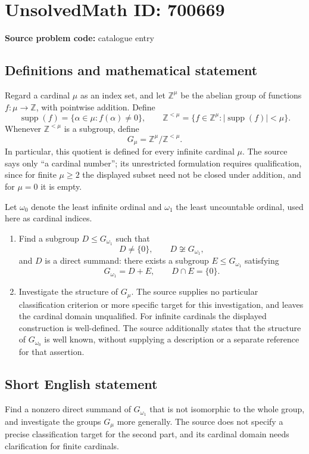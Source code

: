 \documentclass[11pt]{article}
\newcommand{\Z}{\mathbb{Z}}
\begin{document}
\section*{UnsolvedMath ID: 700669}
\textbf{Source problem code:} catalogue entry
\subsection{Definitions and mathematical statement}
Regard a cardinal \(\mu\) as an index set, and let \(\Z^\mu\) be the abelian group of functions \(f\colon\mu\to\Z\), with pointwise addition. Define
\[
\operatorname{supp}(f)=\{\alpha\in\mu:f(\alpha)\ne0\},\qquad
\Z^{<\mu}=\{f\in\Z^\mu:|\operatorname{supp}(f)|<\mu\}.
\]
Whenever \(\Z^{<\mu}\) is a subgroup, define
\[
G_\mu=\Z^\mu/\Z^{<\mu}.
\]
In particular, this quotient is defined for every infinite cardinal \(\mu\). The source says only ``a cardinal number''; its unrestricted formulation requires qualification, since for finite \(\mu\ge2\) the displayed subset need not be closed under addition, and for \(\mu=0\) it is empty.

Let \(\omega_0\) denote the least infinite ordinal and \(\omega_1\) the least uncountable ordinal, used here as cardinal indices.
\begin{enumerate}
\item[(a)] Find a subgroup \(D\le G_{\omega_1}\) such that
\[
D\ne\{0\},\qquad D\not\cong G_{\omega_1},
\]
and \(D\) is a direct summand: there exists a subgroup \(E\le G_{\omega_1}\) satisfying
\[
G_{\omega_1}=D+E,\qquad D\cap E=\{0\}.
\]
\item[(b)] Investigate the structure of \(G_\mu\). The source supplies no particular classification criterion or more specific target for this investigation, and leaves the cardinal domain unqualified. For infinite cardinals the displayed construction is well-defined. The source additionally states that the structure of \(G_{\omega_0}\) is well known, without supplying a description or a separate reference for that assertion.
\end{enumerate}
\subsection{Short English statement}
Find a nonzero direct summand of \(G_{\omega_1}\) that is not isomorphic to the whole group, and investigate the groups \(G_\mu\) more generally. The source does not specify a precise classification target for the second part, and its cardinal domain needs clarification for finite cardinals.
\end{document}
